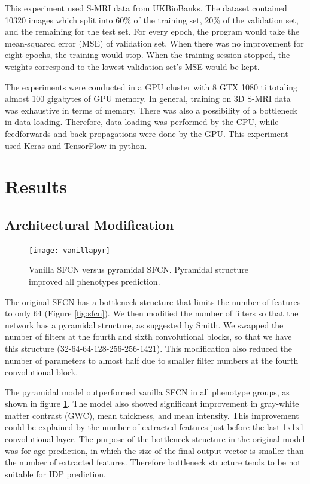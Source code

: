 \documentclass{article}
\begin{document}
    This experiment used S-MRI data from UKBioBanks. 
    The dataset contained 10320 images which split into 60\% of the training set, 20\% of the validation set, and the remaining for the test set. 
    For every epoch, the program would take the mean-squared error (MSE) of validation set. 
    When there was no improvement for eight epochs, the training would stop. 
    When the training session stopped, the weights correspond to the lowest validation set's MSE would be kept.

    The experiments were conducted in a GPU cluster with 8 GTX 1080 ti totaling almost 100 gigabytes of GPU memory. 
    In general, training on 3D S-MRI data was exhaustive in terms of memory. 
    There was also a possibility of a bottleneck in data loading. 
    Therefore, data loading was performed by the CPU, while feedforwards and back-propagations were done by the GPU. 
    This experiment used Keras and TensorFlow in python.
    \section*{Results}
    
    \subsection*{Architectural Modification}
    \begin{figure}[h]
        \centering
        \texttt{[image: vanillapyr]}
        \centering
        \caption{
            Vanilla SFCN versus pyramidal SFCN. 
            Pyramidal structure improved all phenotypes prediction.}
        \label{fig:vanillapyr}
    \end{figure}
    The original SFCN has a bottleneck structure that limits the number of features to only 64 (Figure \ref{fig:sfcn}). 
    We then modified the number of filters so that the network has a pyramidal structure, as suggested by Smith\cite*[]{smith}. 
    We swapped the number of filters at the fourth and sixth convolutional blocks, so that we have this structure (32-64-64-128-256-256-1421). 
    This modification also reduced the number of parameters to almost half due to smaller filter numbers at the fourth convolutional block.

    The pyramidal model outperformed vanilla SFCN in all phenotype groups, as shown in figure \ref{fig:vanillapyr}. 
    The model also showed significant improvement in gray-white matter contrast (GWC), mean thickness, and mean intensity. 
    This improvement could be explained by the number of extracted features just before the last 1x1x1 convolutional layer. 
    The purpose of the bottleneck structure in the original model was for age prediction, in which the size of the final output vector is smaller than the number of extracted features. 
    Therefore bottleneck structure tends to be not suitable for IDP prediction.
\end{document}
